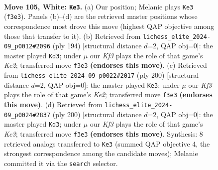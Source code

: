 \documentclass[11pt]{article}
\begin{document}
\clearpage

\begin{figure}[p]\centering
\begin{subfigure}{0.46\textwidth}\centering
\resizebox{\linewidth}{!}{%
\newchessgame
\chessboard[
  setfen={6R1/4k3/7R/8/8/5K2/8/8 w - - 3 105},
  showmover=false,
  pgfstyle=straightmove, color=movearrow, markmove={f3-e3}
]}
\caption{}
\end{subfigure}\hfill
\begin{subfigure}{0.46\textwidth}\centering
\resizebox{\linewidth}{!}{%
\newchessgame
\chessboard[
  setfen={2k5/7R/5r2/8/8/8/2K5/8 w - - 73 98},
  showmover=false,
  pgfstyle=straightmove, color=movearrow, markmove={c2-d3}
]}
\caption{}
\end{subfigure}
\\[4pt]
\begin{subfigure}{0.46\textwidth}\centering
\resizebox{\linewidth}{!}{%
\newchessgame
\chessboard[
  setfen={1R6/6r1/8/8/k7/8/4K3/8 w - - 37 101},
  showmover=false,
  pgfstyle=straightmove, color=movearrow, markmove={e2-e3}
]}
\caption{}
\end{subfigure}\hfill
\begin{subfigure}{0.46\textwidth}\centering
\resizebox{\linewidth}{!}{%
\newchessgame
\chessboard[
  setfen={8/8/8/8/8/2K5/R7/4k3 w - - 19 101},
  showmover=false,
  pgfstyle=straightmove, color=movearrow, markmove={c3-d3}
]}
\caption{}
\end{subfigure}
\caption{\textbf{Move 105, White: \texttt{Ke3}.} (a) Our position; Melanie plays \texttt{Ke3} (\texttt{f3e3}). Panels (b)--(d) are the retrieved master positions whose correspondence most drove this move (highest QAP objective among those that transfer to it). (b) Retrieved from \texttt{lichess\_elite\_2024-09\_p0012\#2096} (ply 194) [structural distance $d$=2, QAP obj=0]: the master played \texttt{Kd3}; under $\mu$ our \emph{Kf3} plays the role of that game's \emph{Kc2}; transferred move \texttt{f3e3} \textbf{(endorses this move)}. (c) Retrieved from \texttt{lichess\_elite\_2024-09\_p0022\#2017} (ply 200) [structural distance $d$=2, QAP obj=0]: the master played \texttt{Ke3}; under $\mu$ our \emph{Kf3} plays the role of that game's \emph{Ke2}; transferred move \texttt{f3e3} \textbf{(endorses this move)}. (d) Retrieved from \texttt{lichess\_elite\_2024-09\_p0024\#2837} (ply 200) [structural distance $d$=2, QAP obj=0]: the master played \texttt{Kd3}; under $\mu$ our \emph{Kf3} plays the role of that game's \emph{Kc3}; transferred move \texttt{f3e3} \textbf{(endorses this move)}. Synthesis: 8 retrieved analogs transferred to \texttt{Ke3} (summed QAP objective 4, the strongest correspondence among the candidate moves); Melanie committed it via the \texttt{search} selector.}
\label{fig:thought-m208}
\end{figure}
\end{document}
